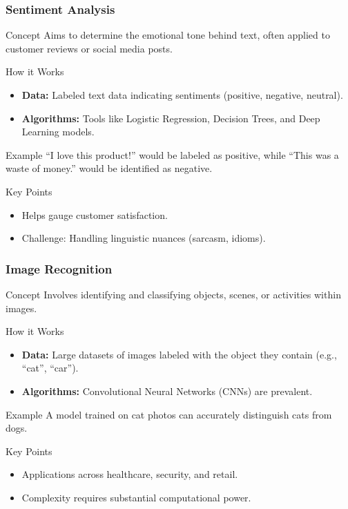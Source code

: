 \documentclass[aspectratio=169]{beamer}
\begin{document}
\begin{frame}[fragile]
    \frametitle{Sentiment Analysis}
    \begin{block}{Concept}
        Aims to determine the emotional tone behind text, often applied to customer reviews or social media posts.
    \end{block}
    \begin{block}{How it Works}
        \begin{itemize}
            \item \textbf{Data:} Labeled text data indicating sentiments (positive, negative, neutral).
            \item \textbf{Algorithms:} Tools like Logistic Regression, Decision Trees, and Deep Learning models.
        \end{itemize}
    \end{block}
    \begin{block}{Example}
        ``I love this product!'' would be labeled as positive, while ``This was a waste of money.'' would be identified as negative.
    \end{block}
    \begin{block}{Key Points}
        \begin{itemize}
            \item Helps gauge customer satisfaction.
            \item Challenge: Handling linguistic nuances (sarcasm, idioms).
        \end{itemize}
    \end{block}
\end{frame}

\begin{frame}[fragile]
    \frametitle{Image Recognition}
    \begin{block}{Concept}
        Involves identifying and classifying objects, scenes, or activities within images.
    \end{block}
    \begin{block}{How it Works}
        \begin{itemize}
            \item \textbf{Data:} Large datasets of images labeled with the object they contain (e.g., ``cat'', ``car'').
            \item \textbf{Algorithms:} Convolutional Neural Networks (CNNs) are prevalent.
        \end{itemize}
    \end{block}
    \begin{block}{Example}
        A model trained on cat photos can accurately distinguish cats from dogs.
    \end{block}
    \begin{block}{Key Points}
        \begin{itemize}
            \item Applications across healthcare, security, and retail.
            \item Complexity requires substantial computational power.
        \end{itemize}
    \end{block}
\end{frame}
\end{document}
